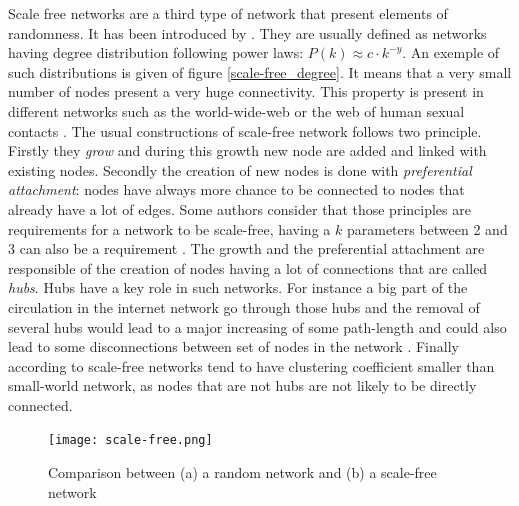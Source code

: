 \documentclass[a4paper, 12pt]{report}
\begin{document}
Scale free networks are a third type of network that present elements of randomness. It has been introduced by \cite{scale-free}. They are usually defined as networks having degree distribution following power laws: $ P(k) \approx c \cdot k^{-y}$. An exemple of such distributions is given of figure \ref{scale-free_degree}. It means that a very small number of nodes present a very huge connectivity.  This property is present in different networks such as the world-wide-web \citep{www} or the web of human sexual contacts \citep{sexual}. The usual constructions of scale-free network follows two principle. Firstly they \textit{grow} and during this growth new node are added and linked with existing nodes. Secondly the creation of new nodes is done with \textit{preferential  attachment}: nodes have always more chance to be connected to nodes that already have a lot of edges. Some authors consider that those principles are requirements for a network to be scale-free, having a $k$ parameters between 2 and 3 can also be a requirement \citep{sf_rare}. The growth and the preferential attachment are responsible of the creation of nodes having a lot of connections that are called \textit{hubs}. Hubs have a key role in such networks. For instance a big part of the circulation in the internet network go through those hubs and the removal of several hubs would lead to a major increasing of some path-length and could also lead to some disconnections between set of nodes in the network \citep{general_scale-free}. Finally according to \cite{SMVSSF} scale-free networks tend to have clustering coefficient smaller than small-world network, as nodes that are not hubs are not likely to be directly connected. \citep{general_scale_free2}\\

\begin{figure}
\centering
\texttt{[image: scale-free.png]}
\caption{Comparison between (a) a random network and (b) a scale-free network \citep{complex_networks}}
\label{scale-free_pictures}
\end{figure}
\end{document}
